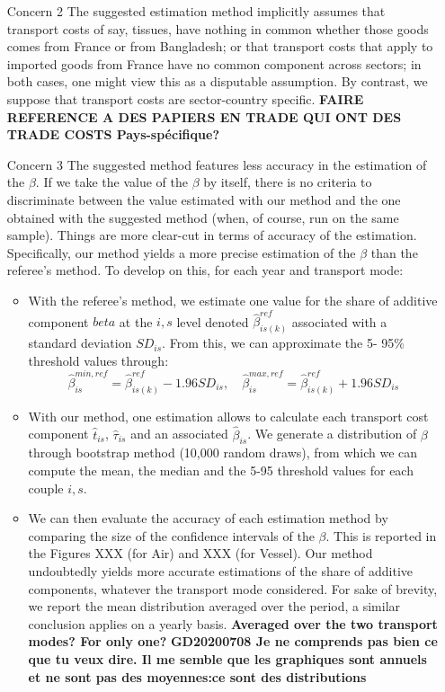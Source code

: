 \documentclass[a4paper,12pt]{article}
\begin{document}
\begin{itemize}
\begin{enumerate}
    \end{enumerate}
\item[Concern 2] The suggested estimation method implicitly assumes that transport costs of say, tissues, have nothing in common whether those goods comes from France or from Bangladesh; or that transport costs that apply to imported goods from France have no common component across sectors; in both cases, one might view this as a disputable assumption. By contrast, we suppose that transport costs are sector-country specific. \textbf{FAIRE REFERENCE A DES PAPIERS EN TRADE QUI ONT DES TRADE COSTS Pays-spécifique?}
\item[Concern 3] The suggested method features less accuracy in the estimation of the $\beta$. If we take the value of the $\beta$ by itself, there is no criteria to discriminate between the value estimated with our method and the one obtained with the suggested method (when, of course, run on the same sample). Things are more clear-cut in terms of accuracy of the estimation. Specifically, our method yields a more precise estimation of the $\beta$ than the referee's method. To develop on this, for each year and transport mode:
    \begin{itemize}
    \item With the referee's method, we estimate one value for the share of additive component $beta$ at the $i,s$ level denoted $\hat{\beta}^{ref}_{is(k)}$ associated with a standard deviation $SD_{is}$. From this, we can approximate the 5- 95\% threshold values through:
        $$\hat{\beta}_{is}^{min,ref} = \hat{\beta}^{ref}_{is(k)} - 1.96 SD_{is},\quad \hat{\beta}_{is}^{max,ref} = \hat{\beta}^{ref}_{is(k)} + 1.96 SD_{is}$$

    \item  With our method, one estimation allows to calculate each transport cost component $\hat{t}_{is}$, $\hat{\tau}_{is}$ and an associated $\hat{\beta}_{is}$. We generate a distribution of $\beta$ through bootstrap method (10,000 random draws), from which we can compute the mean, the median and the 5-95 threshold values for each couple $i,s$.
    
    \item We can then evaluate the accuracy of each estimation method by comparing the size of the confidence intervals of the $\beta$. This is reported in the Figures XXX (for Air) and XXX (for Vessel). Our method undoubtedly yields more accurate estimations of the share of additive components, whatever the transport mode considered. For sake of brevity, we report the mean distribution averaged over the period, a similar conclusion applies on a yearly basis. \textbf{Averaged over the two transport modes? For only one?} \textbf{GD20200708 Je ne comprends pas bien ce que tu veux dire. Il me semble que les graphiques sont annuels et ne sont pas des moyennes:ce sont des distributions}



\end{itemize}
\end{itemize}
\end{document}
